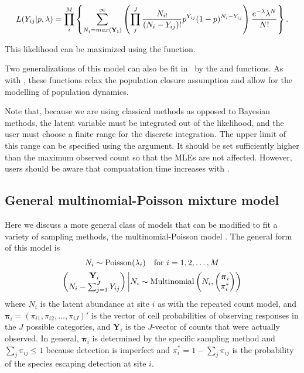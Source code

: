 \documentclass[article,shortnames]{jss}
\DeclareMathOperator{\Poi}{Poisson}
\DeclareMathOperator{\MN}{Multinomial}
\newcommand{\um}{\pkg{unmarked}}
\begin{document}
\begin{equation}
L(Y_{ij}| p,\lambda) = 
 \prod_{i}^{M} 
 \left\{ \sum_{N_{i}=max({\bf Y_i})}^{\infty}
          \left( \prod_{j}^{J} 
     \frac{N_{i!}}{ (N_{i}-Y_{ij})!} p^{Y_{ij}}(1-p)^{N_{i}-Y_{ij}} \right)
       \frac{e^{-\lambda} \lambda^N}{N!} \right\}.
\end{equation}

This likelihood can be maximized using the  function.  

Two generalizations of this model can also be fit in \um\ by the 
 and  functions.  As with ,
these functions relax the population closure assumption and allow for 
the modelling of population dynamics.

Note that,
because we are using classical methods as opposed to Bayesian methods, 
the latent variable  must be integrated out of the likelihood, and the
user must choose a finite range for the discrete integration. The upper 
limit of this range can be specified using the  argument.  It should
be set sufficiently higher than the maximum observed count so that the 
MLEs are not affected.  However, users should be aware that compuatation 
time increases with .



     
\subsection{General multinomial-Poisson mixture model}
\label{sec:gener-mult-poiss}
Here we discuss a more general class of models that can be modified to fit a
variety of sampling methods, the multinomial-Poisson model
\citep{Royle2004a}.   The general form of this model is
\begin{gather}
  N_i \sim \Poi(\lambda_i) \text{\quad for $i=1,2,\dots,M$} \label{eq:mp2} \\
  \begin{pmatrix}
    \mathbf Y_i\\
    N_{i} - \sum_{j=1}^{J} Y_{ij}
   \end{pmatrix}
  \bigg| N_{i} \sim \MN\left(N_i, 
  \begin{pmatrix}
    \boldsymbol \pi_i \\
    \pi_{i}^{*} 
  \end{pmatrix}\right)
\end{gather}
where $N_i$ is the latent abundance at site $i$ as with the repeated
count model, and $\boldsymbol \pi_i=(\pi_{i1},\pi_{i2},\dots,\pi_{iJ})'$ is
the vector of cell probabilities of observing responses in the $J$
possible categories, and $\mathbf Y_{i}$ is the $J$-vector of counts
that were actually observed.  In general, $\boldsymbol \pi_i$ is
determined by the specific sampling method and
$\sum_{j} \pi_{ij} \le 1$ because detection is imperfect and
$\pi_{i}^{*}=1 - \sum_{j} \pi_{ij}$  is the probability of the species
escaping detection at site $i$.  
\end{document}
